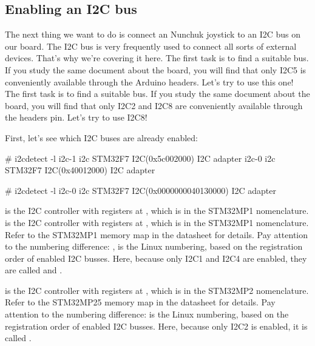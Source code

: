\subsection{Enabling an I2C bus}

The next thing we want to do is connect an Nunchuk joystick
to an I2C bus on our board. The I2C bus is very frequently used
to connect all sorts of external devices. That's why we're covering
it here.
\if{}
The first task is to find a suitable bus. If you study the
same document about the board, you will find that only I2C5 is
conveniently available through the Arduino headers. Let's try
to use this one!
\fi
\if{}
The first task is to find a suitable bus. If you study the
same document about the board, you will find that only I2C2 and I2C8 are
conveniently available through the headers pin. Let's try
to use I2C8!
\fi

First, let's see which I2C buses are already enabled:

\if{}
\begin{bashinput}
# i2cdetect -l
i2c-1	i2c             STM32F7 I2C(0x5c002000)                 I2C adapter
i2c-0	i2c             STM32F7 I2C(0x40012000)                 I2C adapter
\end{bashinput}
\fi
\if{}
\begin{bashinput}
# i2cdetect -l
i2c-0	i2c       	STM32F7 I2C(0x0000000040130000) 	I2C adapter
\end{bashinput}
\fi

\if{}
 is the I2C controller with registers at
, which is  in the STM32MP1
nomenclature.  is the I2C controller with registers at
, which is  in the STM32MP1
nomenclature. Refer to the STM32MP1 memory map in the datasheet for
details. Pay attention to the numbering difference: ,
 is the Linux numbering, based on the registration order
of enabled I2C busses. Here, because only I2C1 and I2C4 are enabled,
they are called  and .
\fi

\if{}
 is the I2C controller with registers at
, which is  in the STM32MP2
nomenclature. Refer to the STM32MP25 memory map in the datasheet for
details. Pay attention to the numbering difference:  is
the Linux numbering, based on the registration order of enabled I2C
busses. Here, because only I2C2 is enabled, it is called .
\fi

